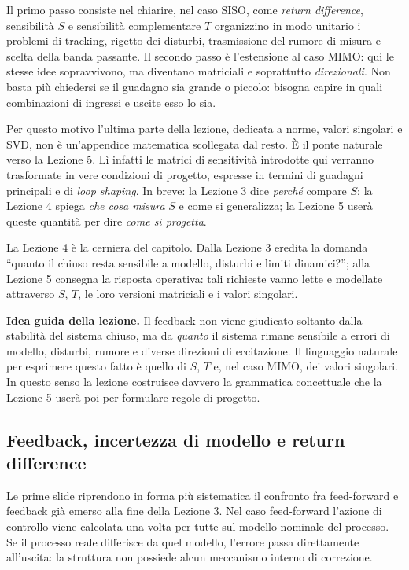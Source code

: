 \documentclass[11pt,a4paper]{article}
\begin{document}
Il primo passo consiste nel chiarire, nel caso SISO, come \emph{return difference}, sensibilità $S$ e sensibilità complementare $T$ organizzino in modo unitario i problemi di tracking, rigetto dei disturbi, trasmissione del rumore di misura e scelta della banda passante. Il secondo passo è l'estensione al caso MIMO: qui le stesse idee sopravvivono, ma diventano matriciali e soprattutto \emph{direzionali}. Non basta più chiedersi se il guadagno sia grande o piccolo: bisogna capire in quali combinazioni di ingressi e uscite esso lo sia.

Per questo motivo l'ultima parte della lezione, dedicata a norme, valori singolari e SVD, non è un'appendice matematica scollegata dal resto. È il ponte naturale verso la Lezione 5. Lì infatti le matrici di sensitività introdotte qui verranno trasformate in vere condizioni di progetto, espresse in termini di guadagni principali e di \emph{loop shaping}. In breve: la Lezione 3 dice \emph{perché} compare $S$; la Lezione 4 spiega \emph{che cosa misura} $S$ e come si generalizza; la Lezione 5 userà queste quantità per dire \emph{come si progetta}.

\begin{keybox}
La Lezione 4 è la cerniera del capitolo. Dalla Lezione 3 eredita la domanda ``quanto il chiuso resta sensibile a modello, disturbi e limiti dinamici?''; alla Lezione 5 consegna la risposta operativa: tali richieste vanno lette e modellate attraverso $S$, $T$, le loro versioni matriciali e i valori singolari.
\end{keybox}

\begin{focusbox}
\textbf{Idea guida della lezione.} Il feedback non viene giudicato soltanto dalla stabilità del sistema chiuso, ma da \emph{quanto} il sistema rimane sensibile a errori di modello, disturbi, rumore e diverse direzioni di eccitazione. Il linguaggio naturale per esprimere questo fatto è quello di $S$, $T$ e, nel caso MIMO, dei valori singolari. In questo senso la lezione costruisce davvero la grammatica concettuale che la Lezione 5 userà poi per formulare regole di progetto.
\end{focusbox}

\subsection{Feedback, incertezza di modello e return difference}

Le prime slide riprendono in forma più sistematica il confronto fra feed-forward e feedback già emerso alla fine della Lezione 3. Nel caso feed-forward l’azione di controllo viene calcolata una volta per tutte sul modello nominale del processo. Se il processo reale differisce da quel modello, l’errore passa direttamente all’uscita: la struttura non possiede alcun meccanismo interno di correzione.
\end{document}
